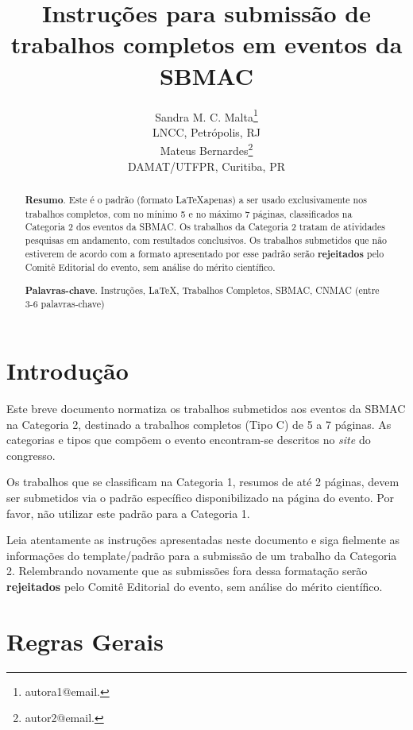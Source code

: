 \documentclass[a4,11pt]{pssbmac}
\begin{document}
\title{Instruções para submissão de trabalhos completos em eventos da SBMAC}

\author{
    {\large Sandra M. C. Malta}\thanks{autora1@email.}\\
    {\small LNCC, Petrópolis, RJ} \\
    {\large Mateus Bernardes}\thanks{autor2@email.} \\
    {\small DAMAT/UTFPR, Curitiba, PR} \\
}

\criartitulo

\begin{abstract}
{\bf Resumo}. Este é o padrão (formato \LaTeX apenas) a ser usado exclusivamente nos trabalhos completos, com no mínimo 5 e no máximo 7 páginas, classificados na Categoria 2 dos eventos da SBMAC. Os trabalhos da Categoria 2 tratam de atividades pesquisas em andamento, com resultados conclusivos. Os trabalhos submetidos que não estiverem de acordo com a formato apresentado por esse padrão serão {\bf rejeitados} pelo Comitê Editorial do evento, sem análise do mérito científico. 

\noindent
{\bf Palavras-chave}. Instruções, \LaTeX, Trabalhos Completos, SBMAC, CNMAC  (entre 3-6 palavras-chave)
\end{abstract}

\section{Introdução}

Este breve documento normatiza os trabalhos submetidos aos eventos da SBMAC na Categoria 2, destinado a trabalhos completos (Tipo C) de 5 a 7 páginas. As categorias e tipos que compõem o evento encontram-se descritos no \textit{site} do congresso.

Os trabalhos que se classificam na Categoria 1, resumos de até 2 páginas, devem ser submetidos via o padrão específico disponibilizado na página do evento. Por favor, não utilizar este padrão para a Categoria 1. 

Leia atentamente as instruções apresentadas neste documento e siga fielmente as informações do template/padrão para a submissão de um trabalho da Categoria 2. Relembrando novamente que as submissões fora dessa formatação serão {\bf rejeitados} pelo Comitê Editorial do evento, sem análise do mérito científico.

\section{Regras Gerais}
\end{document}
